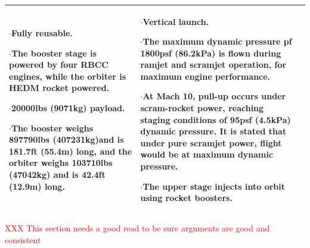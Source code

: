 {\begin{landscape}
\begin{xltabular}{\linewidth}{|X|X|X|}
	$\cdot$Fully reusable. 
	
	$\cdot$The booster stage is powered by four RBCC engines, while the orbiter is HEDM rocket powered. 
	
	$\cdot$20000lbs (9071kg) payload.
	
	$\cdot$The booster weighs 897790lbs (407231kg)and is 181.7ft (55.4m) long, and the orbiter weighs 103710lbs (47042kg) and is 42.4ft (12.9m) long.  
	
	&\small
	
	$\cdot$Vertical launch.
	
	$\cdot$The maximum dynamic pressure pf 1800psf (86.2kPa) is flown during ramjet and scramjet operation, for maximum engine performance. 
	
	$\cdot$At Mach 10, pull-up occurs under scram-rocket power, reaching staging conditions of 95psf (4.5kPa) dynamic pressure. It is stated that under pure scramjet power, flight would be at maximum dynamic pressure. 
	
	$\cdot$The upper stage injects into orbit using rocket boosters. 
	

	\\
\hline 
\end{xltabular} 
\end{landscape}
}

\textcolor{red}{XXX This section needs a good read to be sure arguments are good and consistent}

